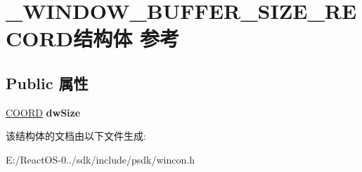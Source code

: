 \hypertarget{struct___w_i_n_d_o_w___b_u_f_f_e_r___s_i_z_e___r_e_c_o_r_d}{}\section{\+\_\+\+W\+I\+N\+D\+O\+W\+\_\+\+B\+U\+F\+F\+E\+R\+\_\+\+S\+I\+Z\+E\+\_\+\+R\+E\+C\+O\+R\+D结构体 参考}
\label{struct___w_i_n_d_o_w___b_u_f_f_e_r___s_i_z_e___r_e_c_o_r_d}
\subsection*{Public 属性}
\begin{DoxyCompactItemize}
\item 
\mbox{\label{struct___w_i_n_d_o_w___b_u_f_f_e_r___s_i_z_e___r_e_c_o_r_d_a6dfbf6f4b5f4a1ac1b96aec04cf9ed2e}} 
\hyperlink{struct___c_o_o_r_d}{C\+O\+O\+RD} {\bfseries dw\+Size}
\end{DoxyCompactItemize}


该结构体的文档由以下文件生成\+:\begin{DoxyCompactItemize}
\item 
E\+:/\+React\+O\+S-\/0../sdk/include/psdk/wincon.\+h\end{DoxyCompactItemize}
